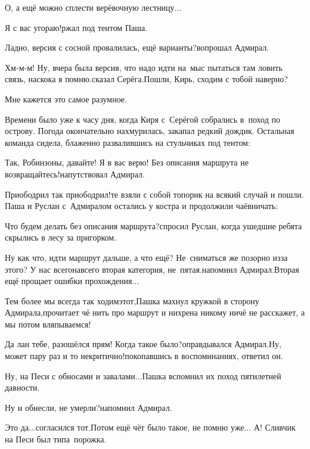 \diagdash О, а ещё можно сплести верёвочную лестницу$\ldots$

\diagdash Я с вас угораю!\mdash ржал под тентом Паша.

\diagdash Ладно, версия с сосной провалилась, ещё варианты?\mdash вопрошал Адмирал.

\diagdash Хм-м-м! Ну, вчера была версия, что надо идти на~мыс пытаться там ловить связь, наскока я помню.\mdash сказал Серёга.\mdash Пошли, Кирь, сходим с тобой наверно?

\diagdash Мне кажется это самое разумное.

Времени было уже к часу дня, когда Киря с~Серёгой собрались в~поход по острову. Погода окончательно нахмурилась, закапал редкий дождик. Остальная команда сидела, блаженно развалившись на стульчиках под тентом:

\diagdash Так, Робинзоны, давайте! Я в вас верю! Без описания маршрута не возвращайтесь!\mdash напутствовал Адмирал.

\diagdash Приободрил так приободрил!\mdash те взяли с собой топорик на всякий случай и пошли. Паша и Руслан с~Адмиралом остались у костра и продолжили чаёвничать:

\diagdash Что будем делать без описания маршрута?\mdash спросил Руслан, когда ушедшие ребята скрылись в лесу за пригорком.

\diagdash Ну как что, идти маршрут дальше, а что ещё? Не~сниматься же позорно из\sdash за этого? У нас всего\sdash навсего вторая категория, не~пятая.\mdash напомнил Адмирал.\mdash Вторая ещё прощает ошибки прохождения$\ldots$

\diagdash Тем более мы всегда так ходим\mdash этот,\mdash Пашка махнул кружкой в сторону Адмирала,\mdash прочитает чё нить про маршрут и нихрена никому ничё не расскажет, а мы потом вляпываемся!

\diagdash Да лан тебе, разошёлся прям! Когда такое было?\mdash оправдывался Адмирал.\mdash Ну, может пару раз и то некритично!\mdash покопавшись в воспоминаниях, ответил он.

\diagdash Ну, на Песи с обносами и завалами$\ldots$\mdash Пашка вспомнил их поход пятилетней давности.

\diagdash Ну и обнесли, не умерли?\mdash напомнил Адмирал.

\diagdash Это да$\ldots$\mdash согласился тот.\mdash Потом ещё чёт было такое, не помню уже$\ldots$ А! Сливчик на Песи был типа~порожка.

